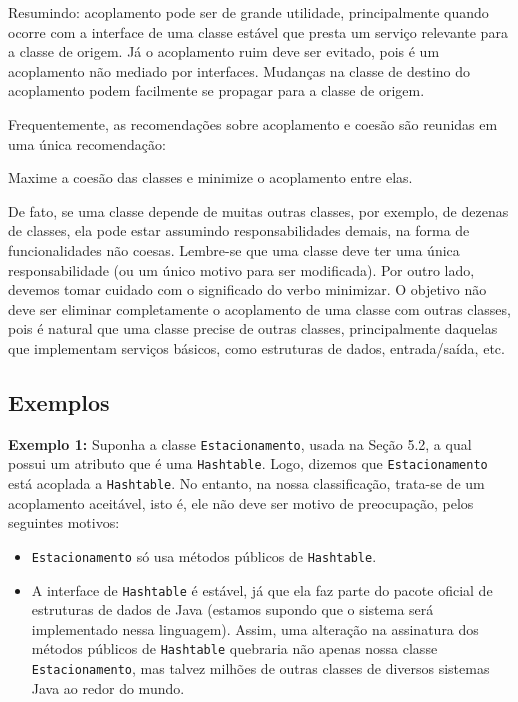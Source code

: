 \documentclass[
  11pt,
  twoside]{book}
\newcommand{\passthrough}[1]{#1}
\renewenvironment{quote}{\centering \vspace{1.5ex} \begin{tcolorbox}[colback=backcolor, width=4.9in]}{\end{tcolorbox}}
\begin{document}
Resumindo: acoplamento pode ser de grande utilidade, principalmente
quando ocorre com a interface de uma classe estável que presta um
serviço relevante para a classe de origem. Já o acoplamento ruim deve
ser evitado, pois é um acoplamento não mediado por interfaces. Mudanças
na classe de destino do acoplamento podem facilmente se propagar para a
classe de origem.

Frequentemente, as recomendações sobre acoplamento e coesão são reunidas
em uma única recomendação:

\begin{quote}
Maxime a coesão das classes e minimize o acoplamento entre elas.
\end{quote}

De fato, se uma classe depende de muitas outras classes, por exemplo, de
dezenas de classes, ela pode estar assumindo responsabilidades demais,
na forma de funcionalidades não coesas. Lembre-se que uma classe deve
ter uma única responsabilidade (ou um único motivo para ser modificada).
Por outro lado, devemos tomar cuidado com o significado do verbo
minimizar. O objetivo não deve ser eliminar completamente o acoplamento
de uma classe com outras classes, pois é natural que uma classe precise
de outras classes, principalmente daquelas que implementam serviços
básicos, como estruturas de dados, entrada/saída, etc.

\hypertarget{exemplos-1}{%
\subsection{Exemplos}\label{exemplos-1}}

\textbf{Exemplo 1:} Suponha a classe
\passthrough{\lstinline!Estacionamento!}, usada na Seção 5.2, a qual
possui um atributo que é uma \passthrough{\lstinline!Hashtable!}. Logo,
dizemos que \passthrough{\lstinline!Estacionamento!} está acoplada a
\passthrough{\lstinline!Hashtable!}. No entanto, na nossa classificação,
trata-se de um acoplamento aceitável, isto é, ele não deve ser motivo de
preocupação, pelos seguintes motivos:

\begin{itemize}
\item
  \passthrough{\lstinline!Estacionamento!} só usa métodos públicos de
  \passthrough{\lstinline!Hashtable!}.
\item
  A interface de \passthrough{\lstinline!Hashtable!} é estável, já que
  ela faz parte do pacote oficial de estruturas de dados de Java
  (estamos supondo que o sistema será implementado nessa linguagem).
  Assim, uma alteração na assinatura dos métodos públicos de
  \passthrough{\lstinline!Hashtable!} quebraria não apenas nossa classe
  \passthrough{\lstinline!Estacionamento!}, mas talvez milhões de outras
  classes de diversos sistemas Java ao redor do mundo.
\end{itemize}
\end{document}
